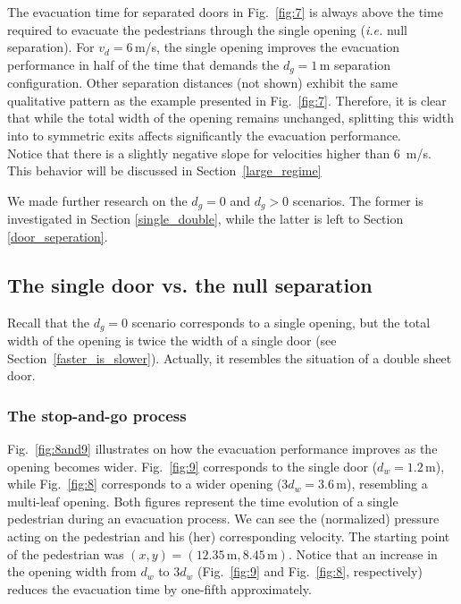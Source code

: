 The evacuation time for separated doors in Fig.~\ref{fig:7} is always above the 
time required to evacuate the pedestrians through the single opening 
(\emph{i.e.} null separation). For $v_d=6\,$m/s, the single opening improves 
the evacuation performance in half of the time that demands the $d_g=1\,$m 
separation configuration. Other separation distances (not shown) exhibit the 
same qualitative pattern as the example presented in Fig.~\ref{fig:7}. 
Therefore, it is clear that while the total width of the opening 
remains unchanged, splitting this width into to symmetric exits affects 
significantly the evacuation performance. \\

{\color{red} Notice that there is a slightly negative slope for velocities higher than 6~m/s. This behavior will be discussed in Section~\ref{large_regime} }

We made further research on the $d_g=0$ and $d_g>0$ scenarios. The 
former is investigated in Section \ref{single_double}, while the latter is left 
to Section \ref{door_seperation}. \\

\subsection{\label{single_double}The single door vs. the null separation}

Recall that the $d_g=0$ scenario corresponds to a single opening, but the total 
width of the opening is twice the width of a single door (see 
Section~\ref{faster_is_slower}). Actually, it resembles the situation of a 
double sheet door.  \\

\subsubsection{\label{null_gap_data}The stop-and-go process}

Fig.~\ref{fig:8and9} illustrates on how the evacuation performance improves as 
the opening becomes wider.  Fig.~\ref{fig:9} corresponds to the single door 
($d_w=1.2\,$m), while  Fig.~\ref{fig:8} corresponds to a wider opening 
($3d_w=3.6\,$m), resembling a multi-leaf opening. Both figures represent 
the time evolution of a single pedestrian during an evacuation process. We can 
see the (normalized) pressure acting on the pedestrian and his (her) 
corresponding velocity. The starting point of the pedestrian was 
$(x,y)=(12.35\,\mathrm{m},8.45\,\mathrm{m})$. Notice that an increase in the 
opening width from $d_w$ to $3d_w$ (Fig.~\ref{fig:9} and Fig.~\ref{fig:8}, 
respectively) reduces the evacuation time by one-fifth approximately. \\

